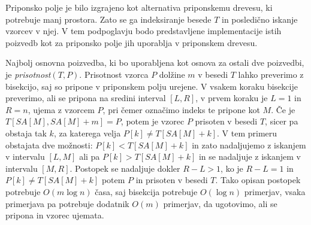 Priponsko polje je bilo izgrajeno kot alternativa priponskemu drevesu, ki potrebuje manj prostora. Zato se ga indeksiranje besede $T$ in posledično iskanje vzorcev v njej. V tem podpoglavju bodo predstavljene implementacije istih poizvedb kot za priponsko polje jih uporablja v priponskem drevesu.

Najbolj osnovna poizvedba, ki bo uporabljena kot osnova za ostali dve poizvedbi, je \textit{prisotnost}$(T,P)$. Prisotnost vzorca $P$ dolžine $m$ v besedi $T$ lahko preverimo z bisekcijo, saj so pripone v priponskem polju urejene. V vsakem koraku bisekcije preverimo, ali se pripona na sredini interval $[L,R]$, v prvem koraku je $L=1$ in $R=n$, ujema z vzorcem $P$, pri čemer označimo indeks te pripone kot $M$. Če je $T[SA[M],SA[M]+m]=P$, potem je vzorec $P$ prisoten v besedi $T$, sicer pa obstaja tak $k$, za katerega velja $P[k]\ne T[SA[M]+k]$. V tem primeru obstajata dve možnosti: $P[k]<T[SA[M]+k]$ in zato nadaljujemo z iskanjem v intervalu $[L,M]$ ali pa $P[k]>T[SA[M]+k]$ in se nadaljuje z iskanjem v intervalu $[M,R]$. Postopek se nadaljuje dokler $R-L>1$, ko je $R-L=1$ in $P[k]\ne T[SA[M]+k]$ potem $P$ in prisoten v besedi $T$. Tako opisan postopek potrebuje $O(m\log{n})$ časa, saj bisekcija potrebuje $O(\log{n})$ primerjav, vsaka primerjava pa potrebuje dodatnik $O(m)$ primerjav, da ugotovimo, ali se pripona in vzorec ujemata.

